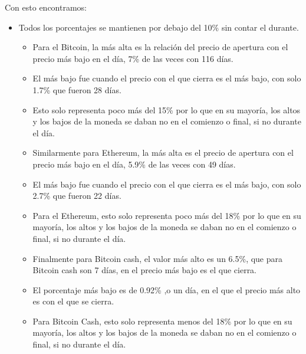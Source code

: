 \documentclass[12pt,letterpaper]{article}
\begin{document}
    Con esto encontramos:

    \begin{itemize}

        \item  Todos los porcentajes se mantienen por debajo del 10\% sin contar el durante.

        \begin{itemize}

            \item Para el Bitcoin, la más alta es la relaci\'on del precio de apertura con el precio más bajo en el día, 7\% de las veces con 116 días.
            
            \item El más bajo fue cuando el precio con el que cierra es el más bajo, con solo 1.7\% que fueron 28 días.

            \item Esto solo representa poco más del 15\% por lo que en su mayoría, los altos y los bajos de la moneda se daban no en el comienzo o final, si no durante el día.

        \end{itemize}

        \begin{itemize}

            \item Similarmente para Ethereum, la más alta es el precio de apertura con el precio más bajo en el día, 5.9\% de las veces con 49 días.
            
            \item El más bajo fue cuando el precio con el que cierra es el más bajo, con solo 2.7\% que fueron 22 días.

            \item Para el Ethereum, esto solo representa poco más del 18\% por lo que en su mayoría, los altos y los bajos de la moneda se daban no en el comienzo o final, si no durante el día.

        \end{itemize}

        \begin{itemize}

            \item Finalmente para Bitcoin cash, el valor más alto es un 6.5\%, que para Bitcoin cash son 7 días, en el precio más bajo es el que cierra.

            \item El porcentaje más bajo es de 0.92\% ,o un día, en el que el precio más alto es con el que se cierra.
    
            \item Para Bitcoin Cash, esto solo representa menos del 18\% por lo que en su mayoría, los altos y los bajos de la moneda se daban no en el comienzo o final, si no durante el día.
        \end{itemize}

    \end{itemize}
\end{document}
